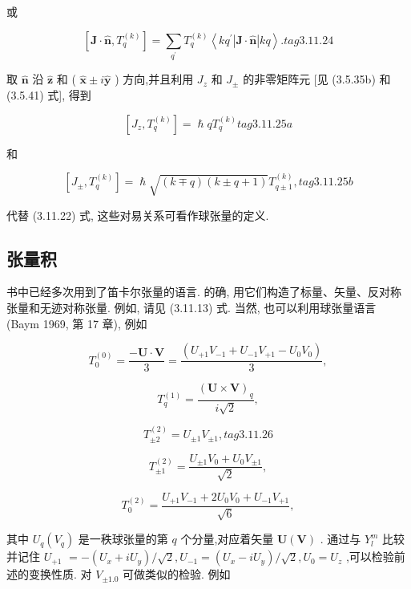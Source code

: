 或

$$
\left\lbrack {\mathbf{J} \cdot \widehat{\mathbf{n}},{T}_{q}^{\left( k\right) }}\right\rbrack = \mathop{\sum }\limits_{{q}^{\prime }}{T}_{q}^{\left( k\right) }\left\langle {k{q}^{\prime }\left| {\mathbf{J} \cdot \widehat{\mathbf{n}}}\right| {kq}}\right\rangle . tag{3.11.24}
$$

取 $\widehat{\mathbf{n}}$ 沿 $\widehat{\mathbf{z}}$ 和 ( $\widehat{\mathbf{x}} \pm i\widehat{\mathbf{y}}$ ) 方向,并且利用 ${J}_{z}$ 和 ${J}_{ \pm }$ 的非零矩阵元 [见 (3.5.35b) 和 (3.5.41) 式], 得到

$$
\left\lbrack {{J}_{z},{T}_{q}^{\left( k\right) }}\right\rbrack = \hslash q{T}_{q}^{\left( k\right) } tag{3.11.25a}
$$

和

$$
\left\lbrack {{J}_{ \pm },{T}_{q}^{\left( k\right) }}\right\rbrack = \hslash \sqrt{\left( {k \mp q}\right) \left( {k \pm q + 1}\right) }{T}_{q \pm 1}^{\left( k\right) }, tag{3.11.25b}
$$

代替 (3.11.22) 式, 这些对易关系可看作球张量的定义.

\subsection{张量积}

书中已经多次用到了笛卡尔张量的语言. 的确, 用它们构造了标量、矢量、反对称张量和无迹对称张量. 例如, 请见 (3.11.13) 式. 当然, 也可以利用球张量语言 (Baym 1969, 第 17 章), 例如

$$
{T}_{0}^{\left( 0\right) } = \frac{-\mathbf{U} \cdot \mathbf{V}}{3} = \frac{\left( {U}_{+1}{V}_{-1} + {U}_{-1}{V}_{+1} - {U}_{0}{V}_{0}\right) }{3},
$$

$$
{T}_{q}^{\left( 1\right) } = \frac{{\left( \mathbf{U} \times \mathbf{V}\right) }_{q}}{i\sqrt{2}},
$$

$$
{T}_{\pm 2}^{\left( 2\right) } = {U}_{\pm 1}{V}_{\pm 1}, tag{3.11.26}
$$

$$
{T}_{\pm 1}^{\left( 2\right) } = \frac{{U}_{\pm 1}{V}_{0} + {U}_{0}{V}_{\pm 1}}{\sqrt{2}},
$$

$$
{T}_{0}^{\left( 2\right) } = \frac{{U}_{+1}{V}_{-1} + 2{U}_{0}{V}_{0} + {U}_{-1}{V}_{+1}}{\sqrt{6}},
$$

其中 ${U}_{q}\left( {V}_{q}\right)$ 是一秩球张量的第 $q$ 个分量,对应着矢量 $\mathbf{U}\left( \mathbf{V}\right)$ . 通过与 ${Y}_{l}^{m}$ 比较并记住 ${U}_{+1}$ $= - \left( {{U}_{x} + i{U}_{y}}\right) /\sqrt{2},{U}_{-1} = \left( {{U}_{x} - i{U}_{y}}\right) /\sqrt{2},{U}_{0} = {U}_{z}$ ,可以检验前述的变换性质. 对 ${V}_{\pm {1.0}}$ 可做类似的检验. 例如

